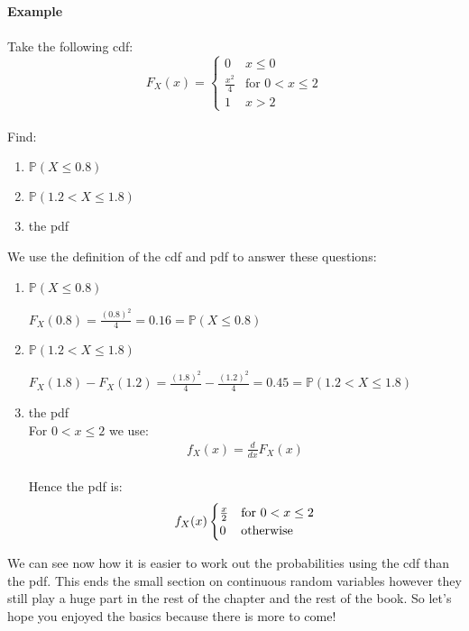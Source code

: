 \documentclass[,oneside]{article}
\begin{document}
\begin{enumerate}
\textbf{Example}\\
\\Take the following cdf:
\[
F_X(x) =
\begin{cases}
0 & x \leq 0 \\
\frac{x^2}{4} & \text{for } 0 < x \leq 2 \\
1 & x > 2
\end{cases} \] \\
Find:
\begin{enumerate}
\item $ \mathbb{P}(X \leq 0.8)$
\item $ \mathbb{P}(1.2 < X \leq 1.8)$
\item the pdf
\end{enumerate}
We use the definition of the cdf and pdf to answer these questions:
\begin{enumerate}
\item $ \mathbb{P}(X \leq 0.8)$
\begin{center}
$F_X(0.8) = \frac{(0.8)^2}{4} = 0.16 = \mathbb{P}(X \leq 0.8)$
\end{center}
\item $ \mathbb{P}(1.2 < X \leq 1.8)$
\begin{center}
$F_X(1.8) - F_X(1.2) = \frac{(1.8)^2}{4} - \frac{(1.2)^2}{4} = 0.45 = \mathbb{P}(1.2 < X \leq 1.8)$
\end{center}
\item the pdf
\\For $0 < x \leq 2$ we use:
\begin{align*}
f_X(x)= \frac{d}{dx} F_X(x)
\end{align*}\\
Hence the pdf is:
\[
f_X(x)
\begin{cases}
\frac{x}{2} & \text{for } 0 < x \leq 2 \\
0 & $otherwise$
\end{cases} \] 
\end{enumerate}
We can see now how it is easier to work out the probabilities using the cdf than the pdf. This ends the small section on continuous random variables however they still play a huge part in the rest of the chapter and the rest of the book. So let's hope you enjoyed the basics because there is more to come!

\end{enumerate}
\end{document}
